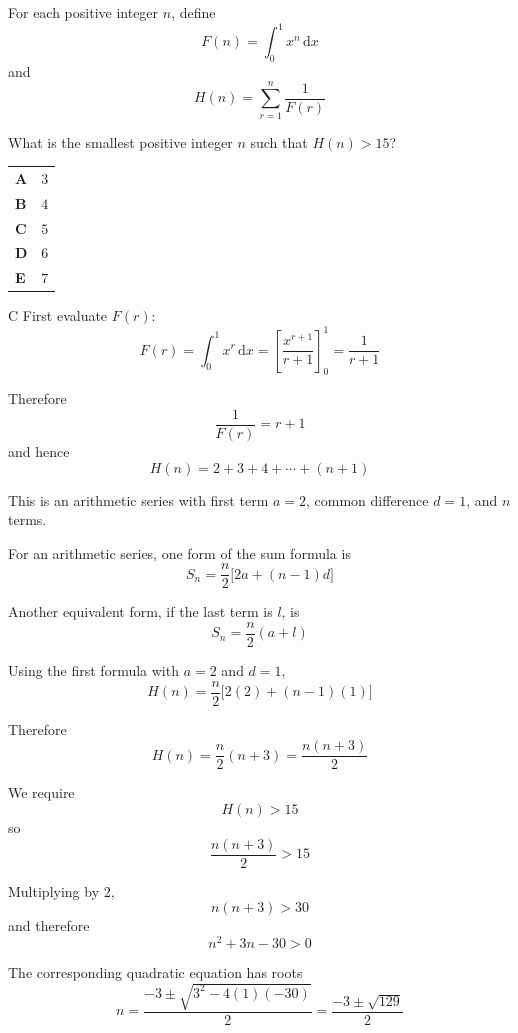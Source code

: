 \documentclass[11pt,a4paper]{article}
\begin{document}
\clearpage
\thispagestyle{djssolutions}
\vspace*{8pt}
\begin{enumerate}[label=\textbf{\arabic*.},leftmargin=*,itemsep=0pt,start=13]
\questionitem[Integration]
For each positive integer $n$, define \[ F(n)=\int_0^1 x^n\,\mathrm{d}x \] and \[ H(n)=\sum_{r=1}^n \frac{1}{F(r)} \]

What is the smallest positive integer $n$ such that $H(n)>15$?

\par\vspace*{12pt}
\begin{tabularx}{\linewidth}{@{}>{\bfseries}l Y@{}}
A &
$3$
\\[0.8em]
B &
$4$
\\[0.8em]
C &
$5$
\\[0.8em]
D &
$6$
\\[0.8em]
E &
$7$
\\
\end{tabularx}

\begin{djsSolution}{C}
First evaluate \(F(r)\):
\[
F(r)=\int_0^1 x^r\,\mathrm{d}x
=\left[\frac{x^{r+1}}{r+1}\right]_0^1
=\frac{1}{r+1}
\]

Therefore
\[
\frac{1}{F(r)}=r+1
\]
and hence
\[
H(n)=2+3+4+\cdots+(n+1)
\]

This is an arithmetic series with first term \(a=2\), common difference \(d=1\), and \(n\) terms.

For an arithmetic series, one form of the sum formula is
\[
S_n=\frac{n}{2}\bigl[2a+(n-1)d\bigr]
\]

Another equivalent form, if the last term is \(l\), is
\[
S_n=\frac{n}{2}(a+l)
\]

Using the first formula with \(a=2\) and \(d=1\),
\[
H(n)
=\frac{n}{2}\bigl[2(2)+(n-1)(1)\bigr]
\]

Therefore
\[
H(n)
=\frac{n}{2}(n+3)
=\frac{n(n+3)}{2}
\]

We require
\[
H(n)>15
\]
so
\[
\frac{n(n+3)}{2}>15
\]

Multiplying by \(2\),
\[
n(n+3)>30
\]
and therefore
\[
n^2+3n-30>0
\]

The corresponding quadratic equation has roots
\[
n=\frac{-3\pm\sqrt{3^2-4(1)(-30)}}{2}
=\frac{-3\pm\sqrt{129}}{2}
\]


\end{djsSolution}
\end{enumerate}
\end{document}
